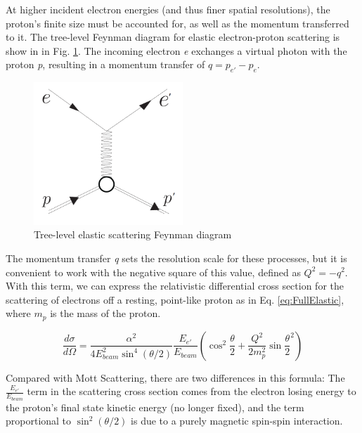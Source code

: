     
 
         At higher incident electron energies (and thus finer spatial resolutions), the proton's finite size must be accounted for, as well as the momentum transferred to it. The tree-level Feynman diagram for elastic electron-proton scattering is show in in Fig. \ref{fig:feynmanElastic}. The incoming electron \textit{e} exchanges a virtual photon with the proton \textit{p}, resulting in a momentum transfer of $q = p_{e'} - p_{e}$. 
         
        \begin{figure}[H]\label{fig:feynmanElastic}
            \centering
            \includegraphics[width=0.5\textwidth]{Chapters/Ch1-Intro/Ch1-Sec1-Background/pics/elastic_feynamn.png}
            \caption{Tree-level elastic scattering Feynman diagram}
        \end{figure}

        The momentum transfer \textit{q} sets the resolution scale for these processes, but it is convenient to work with the negative square of this value, defined as $Q^2 = -q^2$. With this term, we can express the relativistic differential cross section for the scattering of electrons off a resting, point-like proton as in Eq. \ref{eq:FullElastic}, where $m_p$ is the mass of the proton. 

            \begin{equation}\label{eq:FullElastic}
                    \frac{d\sigma}{d\Omega} = \frac{\alpha^2}{4E_{beam}^2\sin^4{(\theta/2)}} \frac{E_{e'}}{E_{beam}} ( \cos^2{\frac{\theta}{2}} + \frac{Q^2}{2m_p^2}\sin{\frac{\theta}{2}}^2 )
            \end{equation}


            Compared with Mott Scattering, there are two differences in this formula: The $\frac{E_{e'}}{E_{beam}}$ term in the scattering cross section comes from the electron losing energy to the proton's final state kinetic energy (no longer fixed), and the term proportional to $\sin^2(\theta/2)$ is due to a purely magnetic spin-spin interaction. 


